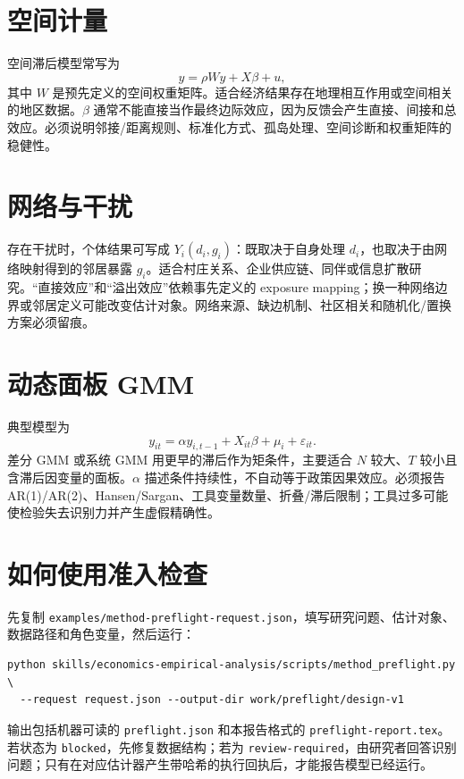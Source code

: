 \documentclass[UTF8]{ctexart}
\begin{document}
\section{空间计量}

空间滞后模型常写为
\[
y=\rho Wy+X\beta+u,
\]
其中 $W$ 是预先定义的空间权重矩阵。适合经济结果存在地理相互作用或空间相关的地区数据。$\beta$ 通常不能直接当作最终边际效应，因为反馈会产生直接、间接和总效应。必须说明邻接/距离规则、标准化方式、孤岛处理、空间诊断和权重矩阵的稳健性。

\section{网络与干扰}

存在干扰时，个体结果可写成 $Y_i(d_i,g_i)$：既取决于自身处理 $d_i$，也取决于由网络映射得到的邻居暴露 $g_i$。适合村庄关系、企业供应链、同伴或信息扩散研究。``直接效应''和``溢出效应''依赖事先定义的 exposure mapping；换一种网络边界或邻居定义可能改变估计对象。网络来源、缺边机制、社区相关和随机化/置换方案必须留痕。

\section{动态面板 GMM}

典型模型为
\[
y_{it}=\alpha y_{i,t-1}+X_{it}\beta+\mu_i+\varepsilon_{it}.
\]
差分 GMM 或系统 GMM 用更早的滞后作为矩条件，主要适合 $N$ 较大、$T$ 较小且含滞后因变量的面板。$\alpha$ 描述条件持续性，不自动等于政策因果效应。必须报告 AR(1)/AR(2)、Hansen/Sargan、工具变量数量、折叠/滞后限制；工具过多可能使检验失去识别力并产生虚假精确性。

\section{如何使用准入检查}

先复制 \texttt{examples/method-preflight-request.json}，填写研究问题、估计对象、数据路径和角色变量，然后运行：

\begin{verbatim}
python skills/economics-empirical-analysis/scripts/method_preflight.py \
  --request request.json --output-dir work/preflight/design-v1
\end{verbatim}

输出包括机器可读的 \texttt{preflight.json} 和本报告格式的 \texttt{preflight-report.tex}。若状态为 \texttt{blocked}，先修复数据结构；若为 \texttt{review-required}，由研究者回答识别问题；只有在对应估计器产生带哈希的执行回执后，才能报告模型已经运行。
\end{document}
